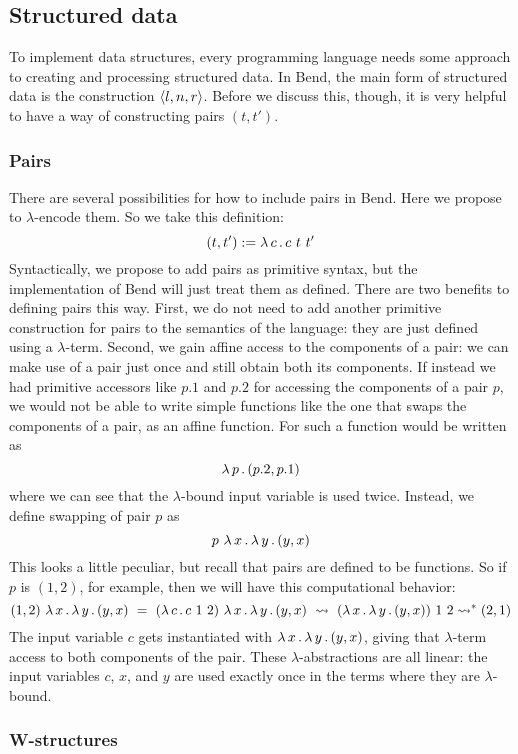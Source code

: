 \documentclass{article}
\begin{document}
\subsection{Structured data}

To implement data structures, every programming language needs some
approach to creating and processing structured data.  In Bend, the
main form of structured data is the construction $\langle l , n, r \rangle$.
Before we discuss this, though, it is very helpful to have a way of
constructing pairs $(t,t')$.

\subsubsection{Pairs}

There are several possibilities for how to include pairs in Bend.
Here we propose to $\lambda$-encode them.  So we take this definition:
\[
(t,t') := \lambda\, c\, .\, c\ t\ t'
\]
\noindent Syntactically, we propose to add pairs as primitive syntax,
but the implementation of Bend will just treat them as defined.  There
are two benefits to defining pairs this way.  First, we do not need to
add another primitive construction for pairs to the semantics of the
language: they are just defined using a $\lambda$-term.  Second, we
gain affine access to the components of a pair: we can make use of a
pair just once and still obtain both its components.  If instead we
had primitive accessors like $p.1$ and $p.2$ for accessing the
components of a pair $p$, we would not be able to write simple
functions like the one that swaps the components of a pair, as an
affine function.  For such a function would be written as
\[
\lambda\, p\, .\, (p.2,p.1)
\]
\noindent where we can see that the $\lambda$-bound input variable is used twice.
Instead, we define swapping of pair $p$ as
\[
p\ \lambda\, x\, .\, \lambda\, y\, .\, (y,x)
\]
\noindent This looks a little peculiar, but recall that pairs are defined to be functions.
So if $p$ is $(1,2)$, for example, then we will have this computational behavior:
\[
(1,2)\ \lam{x}{\lam{y}{(y,x)}} \ =\ (\lam{c}{c\ 1\ 2})\ \lam{x}{\lam{y}{(y,x)}}\ \leadsto\ (\lam{x}{\lam{y}{(y,x)}})\ 1\ 2 \leadsto^* (2,1)
\]
\noindent The input variable $c$ gets instantiated with
$\lambda\, x\, .\, \lambda\, y\, .\, (y,x)$, giving that $\lambda$-term access to both
components of the pair.  These $\lambda$-abstractions are all linear:
the input variables $c$, $x$, and $y$ are used exactly once in the
terms where they are $\lambda$-bound.

\subsubsection{W-structures}
\label{sec:wstruct}
\end{document}

